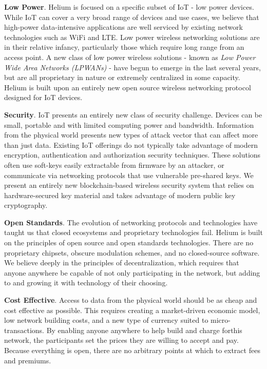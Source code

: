 \documentclass[letterpaper,11pt]{article}
\begin{document}
\textbf{Low Power}. Helium is focused on a specific subset of IoT - low power devices. While IoT can cover a very broad range of devices and use cases, we believe that high-power data-intensive applications are well serviced by existing network technologies such as WiFi and LTE. Low power wireless networking solutions are in their relative infancy, particularly those which require long range from an access point. A new class of low power wireless solutions - known as \emph{Low Power Wide Area Networks (LPWANs)} - have begun to emerge in the last several years, but are all proprietary in nature or extremely centralized in some capacity. Helium is built upon an entirely new open source wireless networking protocol designed for IoT devices.\newline

\textbf{Security}. IoT presents an entirely new class of security challenge. Devices can be small, portable and with limited computing power and bandwidth. Information from the physical world presents new types of attack vector that can affect more than just data. Existing IoT offerings do not typically take advantage of modern encryption, authentication and authorization security techniques. These solutions often use soft-keys easily extractable from firmware by an attacker, or communicate via networking protocols that use vulnerable pre-shared keys. We present an entirely new blockchain-based wireless security system that relies on hardware-secured key material and takes advantage of modern public key cryptography.\newline

\textbf{Open Standards}. The evolution of networking protocols and technologies have taught us that closed ecosystems and proprietary technologies fail. Helium is built on the principles of open source and open standards technologies. There are no proprietary chipsets, obscure modulation schemes, and no closed-source software. We believe deeply in the principles of decentralization, which requires that anyone anywhere be capable of not only participating in the network, but adding to and growing it with technology of their choosing.\newline

\textbf{Cost Effective}. Access to data from the physical world should be as cheap and cost effective as possible. This requires creating a market-driven economic model, low network building costs, and a new type of currency suited to micro-transactions. By enabling anyone anywhere to help build and charge forthis network, the participants set the prices they are willing to accept and pay. Because everything is open, there are no arbitrary points at which to extract fees and premiums. \newline
\end{document}
